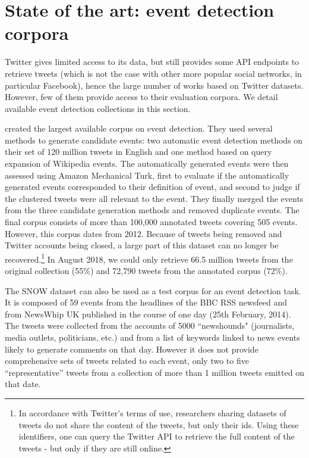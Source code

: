 \section{State of the art: event detection corpora}
\label{state of the art}

Twitter gives limited access to its data, but still provides some API endpoints to retrieve tweets (which is not the case with other more popular social networks, in particular Facebook), hence the large number of works based on Twitter datasets. However, few of them provide access to their evaluation corpora. We detail available event detection collections in this section.

\citet{mcminn_building_2013} created the largest available corpus on event detection. They used several methods to generate candidate events: two automatic event detection methods on their set of 120 million tweets in English and one method based on query expansion of Wikipedia events. The automatically generated events were then assessed using Amazon Mechanical Turk, first to evaluate if the automatically generated events corresponded to their definition of event, and second to judge if the clustered tweets were all relevant to the event. They finally merged the events from the three candidate generation methods and removed duplicate events. The final corpus consists of more than 100,000 annotated tweets covering 505 events. However, this corpus dates from 2012.
Because of tweets being removed and Twitter accounts being closed, a large part of this dataset can no longer be recovered.\footnote{
In accordance with Twitter’s terms of use, researchers sharing datasets of tweets do not share the content of the tweets,
but only their ids. Using these identifiers, one can query the Twitter API to retrieve the full content of the tweets - but only if they are still online.
} In August 2018, we could only retrieve 66.5 million tweets from the original collection (55\%) and 72,790 tweets from  the annotated corpus (72\%).

The SNOW dataset \citep{papadopoulos_snow_2014} can also be used as a test corpus for an event detection task. It is composed of 59 events from the headlines of the BBC RSS newsfeed and from NewsWhip UK published in the course of one day (25th February, 2014). The tweets were collected from the accounts of 5000 ``newshounds" (journalists, media outlets, politicians, etc.) and from a list of keywords linked to news events likely to generate comments on that day.  However it does not provide comprehensive sets of tweets related to each event, only two to five “representative” tweets from a collection of more than 1 million tweets emitted on that date.

